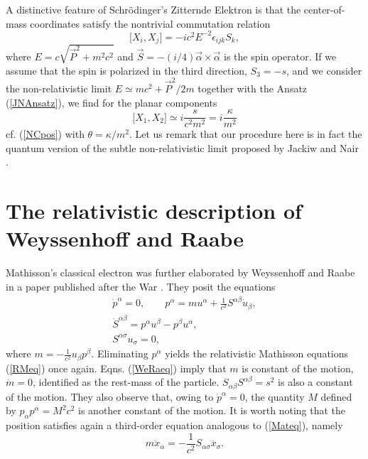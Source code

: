 \documentclass[a4paper,11pt]{article}
\let\ssection=\section
\renewcommand{\section}{\setcounter{equation}{0}\ssection}
\def\vP{{\vec P}}
\def\vS{\vec{S}}
\def\valpha{\vec{\alpha}}
\begin{document}
A distinctive feature of Schr\"odinger's Zitternde Elektron
is that the center-of-mass
coordinates satisfy the nontrivial commutation relation
\begin{equation}
     \big[X_{i},X_{j}]=-ic^2E^{-2}\epsilon_{ijk}S_{k},
\end{equation}
where $E=c\sqrt{\vP^2+m^2c^2}$ and $\vS=-(i/4)\valpha\times\valpha$
is the spin operator. If we assume that
the spin is polarized in the
third direction, $S_{3}=-s$, and we consider the non-relativistic
limit $E\simeq mc^2+\vP^2/2m$ together with the Ansatz
(\ref{JNAnsatz}), we find for the planar components
\begin{equation}
     \big[X_{1},X_{2}]\simeq i\frac{s}{c^2m^2}=i\frac{\kappa}{m^2}
\end{equation}
cf. (\ref{NCpos}) with $\theta=\kappa/m^2$.
Let us remark that our procedure here is in fact the quantum version of
the subtle non-relativistic limit proposed by Jackiw and Nair
\cite{JaNa}.


\section{The relativistic description of Weyssenhoff and Raabe}

Mathisson's classical electron was further elaborated
by Weyssenhoff and Raabe in a paper
published after the War \cite{WeyRaa}. They posit the equations
\begin{equation}
     \begin{array}{ll}
     \dot{p}^\alpha=0,\qquad
     p^\alpha=mu^\alpha+
     \displaystyle\frac{1}{c^2}S^{\alpha\beta}\dot{u}_{\beta},
     \\[8pt]
     \dot{S}^{\alpha\beta}=p^\alpha u^{\beta}-p^\beta u^{\alpha},
     \\[6pt]
     S^{\alpha\sigma}u_{\sigma}=0,
     \end{array}
     \label{WeRaeq}
\end{equation}
where
$
m=-\frac{1}{c^2}u_{\beta}p^\beta.
$
Eliminating $p^\alpha$ yields the relativistic
Mathisson equations (\ref{RMeq})
once again. Eqns. (\ref{WeRaeq}) imply that $m$ is
constant of the motion, $\dot{m}=0$, identified as the rest-mass
of the particle. $S_{\alpha\beta}S^{\alpha\beta}=s^2$
is also a constant of the motion. They also
observe that, owing to $\dot{p}^\alpha=0$, the quantity
$M$ defined by $p_{\alpha}p^{\alpha}=M^2c^2$ is another constant of
the motion.
It is worth noting that the position satisfies again
a third-order equation analogous to (\ref{Mateq}), namely
\begin{equation}
     m\ddot{x}_{\alpha}=-\frac{1}{c^2}S_{\alpha\sigma}\dddot{x}_{\sigma}.
     \label{WR3}
\end{equation}
\end{document}
